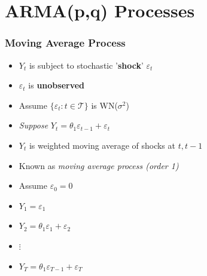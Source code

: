 \documentclass{beamer}
\begin{document}
\section{ARMA(p,q) Processes}	
		\begin{frame}
			\frametitle{Moving Average Process}
			\large
			\begin{itemize}
				\item[] $Y_t$ is subject to  stochastic '\textbf{shock}' $\varepsilon_t$  
				\vspace{3pt} \pause
				\item[] \hspace{25pt}  $\varepsilon_t$ is \textbf{unobserved} 
						\vspace{2pt} \pause
				\item[]\hspace{25pt} Assume $\{\varepsilon_t: t\in\mathcal{T}\}$ is WN($\sigma^2$)
					\vspace{8pt} \pause
				\item[] \textit{Suppose} 
				 $Y_t=\theta_1\varepsilon_{t-1}+\varepsilon_t$
					\vspace{2pt} \pause
				
				\item[]   \hspace{25pt} $Y_t$ is weighted moving average of shocks at $t,t-1$
					\vspace{3pt} \pause
				\item[] \hspace{25pt}  Known as \textit{moving average process (order 1)}
					\vspace{5pt} \pause
				\item[] Assume $\varepsilon_0=0$
					\vspace{2pt} \pause
				\item[]  \hspace{25pt} $Y_1=\varepsilon_1$
				\pause
				\item[]  \hspace{25pt}  $Y_2=\theta_1\varepsilon_1+ \varepsilon_2$\pause
				\item[]  \hspace{25pt}  $\vdots$
				\item[]  \hspace{25pt} $Y_T=\theta_1\varepsilon_{T-1}+ \varepsilon_{T}$
				
		
				
				
			\end{itemize}
			
		\end{frame}
\end{document}
